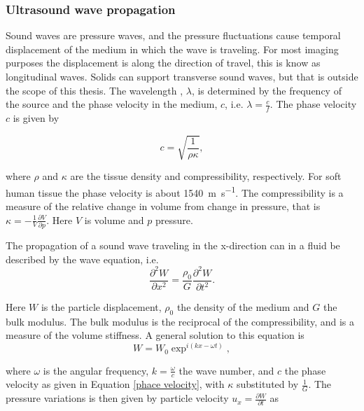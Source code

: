 \subsubsection{Ultrasound wave propagation}
Sound waves are pressure waves, and the pressure fluctuations cause temporal displacement of the medium in which the wave is traveling. For most imaging purposes the displacement is along the direction of travel, this is know as longitudinal waves. Solids can support transverse sound waves, but that is outside the scope of this thesis.  The wavelength , $\lambda$, is determined by the frequency of the source and the phase velocity in the medium, $c$, i.e. $\lambda= \frac{c}{f}$. The phase velocity $c$ is given by

\begin{equation}
\label{phace velocity}
c = \sqrt{\frac{1}{\rho \kappa}},
\end{equation}

where $\rho$ and $\kappa$ are the tissue density and compressibility, respectively. For soft human tissue the phase velocity is about \SI{1540}{\metre\per\second}.%
The compressibility is a measure of the relative change in volume from change in pressure, that is $\kappa = -\frac{1}{V}\frac{\partial V}{\partial p}$. Here $V$ is volume and $p$ pressure. 

The propagation of a sound wave traveling in the x-direction can in a fluid be described by the wave equation, i.e.
\begin{equation}
\label{wave equation}
\frac{\partial^2W}{\partial x^2} = \frac{\rho_0}{G}\frac{\partial^2W}{\partial t^2}.
\end{equation}

Here $W$ is the particle displacement, $\rho_0$ the density of the medium and $G$ the bulk modulus. The bulk modulus is the reciprocal of the compressibility, and is a measure of the volume stiffness. A general solution to this equation is 
\begin{equation}
\label{particle displacement}
W = W_0 \exp^{i(kx - \omega t)},
\end{equation}

where $\omega$ is the angular frequency, $k = \frac{\omega}{c}$ the wave number, and $c$ the phase velocity as given in Equation \eqref{phace velocity}, with $\kappa$ substituted by $\frac{1}{G}$. The pressure variations is then given by particle velocity $u_x = \frac{\partial W}{\partial t}$ as 

